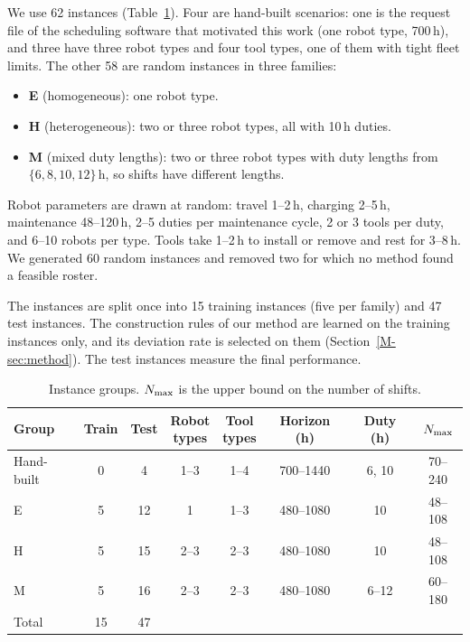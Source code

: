 \documentclass[journal]{IEEEtran}
\begin{document}
We use 62 instances (Table~\ref{tab:instances}).
Four are hand-built scenarios: one is the request file of the scheduling software that motivated this work (one robot type, 700\,h),
and three have three robot types and four tool types, one of them with tight fleet limits.
The other 58 are random instances in three families:
\begin{itemize}
  \item \textbf{E} (homogeneous): one robot type.
  \item \textbf{H} (heterogeneous): two or three robot types, all with 10\,h duties.
  \item \textbf{M} (mixed duty lengths): two or three robot types with duty lengths from $\{6,8,10,12\}$\,h, so shifts have different lengths.
\end{itemize}
Robot parameters are drawn at random: travel 1--2\,h, charging 2--5\,h, maintenance 48--120\,h,
2--5 duties per maintenance cycle, 2 or 3 tools per duty, and 6--10 robots per type.
Tools take 1--2\,h to install or remove and rest for 3--8\,h.
We generated 60 random instances and removed two for which no method found a feasible roster.

The instances are split once into 15 training instances (five per family) and 47 test instances.
The construction rules of our method are learned on the training instances only, and its deviation rate is selected on them (Section~\ref{M-sec:method}).
The test instances measure the final performance.

\begin{table}[t]
  \centering
  \caption{Instance groups. $N_{\max}$ is the upper bound on the number of shifts.}
  \label{tab:instances}
  \footnotesize
  \setlength{\tabcolsep}{2.5pt}
  \begin{tabular}{@{}lccccccc@{}}
    \toprule
    Group & Train & Test & \shortstack{Robot\\types} & \shortstack{Tool\\types} & Horizon (h) & Duty (h) & $N_{\max}$ \\
    \midrule
    Hand-built & 0 & 4  & 1--3 & 1--4 & 700--1440 & 6, 10 & 70--240 \\
    E        & 5 & 12 & 1    & 1--3 & 480--1080 & 10    & 48--108 \\
    H        & 5 & 15 & 2--3 & 2--3 & 480--1080 & 10    & 48--108 \\
    M        & 5 & 16 & 2--3 & 2--3 & 480--1080 & 6--12 & 60--180 \\
    \midrule
    Total    & 15 & 47 & & & & & \\
    \bottomrule
  \end{tabular}
\end{table}
\end{document}
